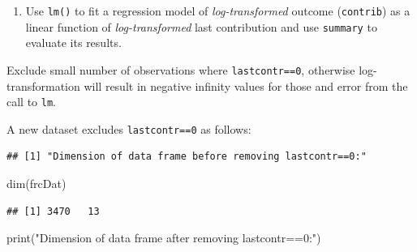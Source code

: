 \documentclass[
]{article}
\newenvironment{Shaded}{\begin{snugshade}}{\end{snugshade}}
\newcommand{\CommentTok}[1]{\textcolor[rgb]{0.56,0.35,0.01}{\textit{#1}}}
\newcommand{\DecValTok}[1]{\textcolor[rgb]{0.00,0.00,0.81}{#1}}
\newcommand{\DocumentationTok}[1]{\textcolor[rgb]{0.56,0.35,0.01}{\textbf{\textit{#1}}}}
\newcommand{\FunctionTok}[1]{\textcolor[rgb]{0.00,0.00,0.00}{#1}}
\newcommand{\NormalTok}[1]{#1}
\newcommand{\OtherTok}[1]{\textcolor[rgb]{0.56,0.35,0.01}{#1}}
\newcommand{\SpecialCharTok}[1]{\textcolor[rgb]{0.00,0.00,0.00}{#1}}
\newcommand{\StringTok}[1]{\textcolor[rgb]{0.31,0.60,0.02}{#1}}
\providecommand{\tightlist}{%
  \setlength{\itemsep}{0pt}\setlength{\parskip}{0pt}}
\begin{document}
\begin{enumerate}
\def\labelenumi{\arabic{enumi}.}
\tightlist
\item
  Use \texttt{lm()} to fit a regression model of \emph{log-transformed}
  outcome (\texttt{contrib}) as a linear function of
  \emph{log-transformed} last contribution and use \texttt{summary} to
  evaluate its results.
\end{enumerate}

Exclude small number of observations where \texttt{lastcontr==0},
otherwise log-transformation will result in negative infinity values for
those and error from the call to \texttt{lm}.

A new dataset excludes \texttt{lastcontr==0} as follows:

\begin{Shaded}
\end{Shaded}

\begin{verbatim}
## [1] "Dimension of data frame before removing lastcontr==0:"
\end{verbatim}

\begin{Shaded}
\begin{Highlighting}[]
\FunctionTok{dim}\NormalTok{(frcDat)}
\end{Highlighting}
\end{Shaded}

\begin{verbatim}
## [1] 3470   13
\end{verbatim}

\begin{Shaded}
\begin{Highlighting}[]
\FunctionTok{print}\NormalTok{(}\StringTok{"Dimension of data frame after removing lastcontr==0:"}\NormalTok{)}
\end{Highlighting}
\end{Shaded}
\end{document}
